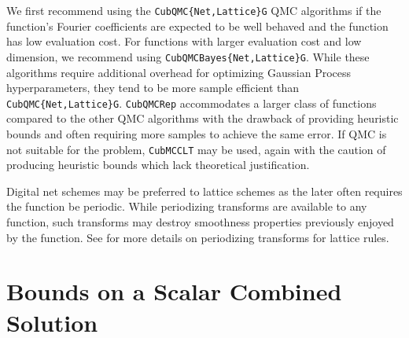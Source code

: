 \documentclass[graybox]{svmult}
\begin{document}
We first recommend using the  \texttt{CubQMC\{Net,Lattice\}G} QMC algorithms if the function's Fourier coefficients are expected to be well behaved and the function has low evaluation cost. For functions with larger evaluation cost and low dimension, we recommend using  \texttt{CubQMCBayes\{Net,Lattice\}G}. While these algorithms require additional overhead for optimizing Gaussian Process hyperparameters, they tend to be more sample efficient than \texttt{CubQMC\{Net,Lattice\}G}. \texttt{CubQMCRep} accommodates a larger class of functions compared to the other QMC algorithms with the drawback of providing heuristic bounds and often requiring more samples to achieve the same error. If QMC is not suitable for the problem, \texttt{CubMCCLT} may be used, again with the caution of producing heuristic bounds which lack theoretical justification.

Digital net schemes may be preferred to lattice schemes as the later often requires the function be periodic. While periodizing transforms are available to any function, such transforms may destroy smoothness properties previously enjoyed by the function. See \cite[Chapter 16]{mcbook} for more details on periodizing transforms for lattice rules.

\section{Bounds on a Scalar Combined Solution} \label{SoRa_sec:comb_sol_approx}
\end{document}
